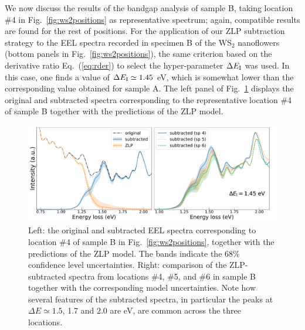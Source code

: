 We now discuss the results of the bandgap analysis of sample B,
taking location \#4 in Fig.~\ref{fig:ws2positions} as representative spectrum; 
again, compatible results are found for the rest of positions.
%
For the application of our ZLP subtraction strategy to the EEL spectra recorded in specimen B
of the WS$_2$ nanoflowers (bottom panels
in Fig.~\ref{fig:ws2positions}), the same criterion
based on the derivative ratio Eq.~(\ref{eq:rder}) to select the hyper-parameter $\Delta E_{\rm I}$ was
used.
%
In this case, one finds a value of $\Delta E_{\rm I}\simeq 1.45$ eV,
which is somewhat lower than the corresponding value obtained for sample A.
%
The left panel of Fig.~\ref{fig:SubtractedEELS_sampleB} displays
the original and subtracted spectra corresponding to the representative
location \#4 of sample B together with the predictions of the ZLP model.
%
\begin{figure}[H]
\begin{centering}
  \includegraphics[width=0.98\linewidth]{plots/subtractedEELS_plot_sampleB_sp4.pdf}
  \caption{Left: the original
     and subtracted EEL spectra corresponding to location \#4 of sample B in Fig.~\ref{fig:ws2positions},
     together with the predictions of the ZLP model.
     The bands indicate the 68\% confidence level uncertainties.
     Right: comparison of the ZLP-subtracted spectra from locations \#4, \#5, and \#6 in sample B
     together with the corresponding model uncertainties.
     Note how several features of the subtracted spectra, in particular
     the peaks at $\Delta E\simeq 1.5$,
    1.7 and 2.0 are eV, are common across the three locations.
  }
\label{fig:SubtractedEELS_sampleB}
\end{centering}
\end{figure}

